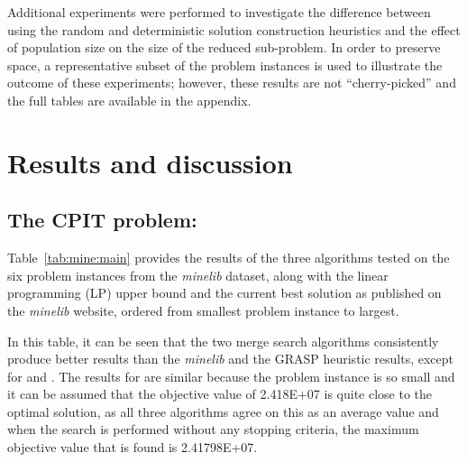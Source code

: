 \documentclass[journal]{IEEEtran}
\begin{document}
Additional experiments were performed to investigate the difference between using the random and deterministic solution construction heuristics and the effect of population size on the size of the reduced sub-problem. In order to preserve space, a representative subset of the problem instances is used to illustrate the outcome of these experiments; however, these results are not ``cherry-picked'' and the full tables are available in the appendix. 

\section{Results and discussion}\label{sec:results}
\subsection{The CPIT problem:}
Table~\ref{tab:mine:main} provides the results of the three algorithms tested on the six problem instances from the \emph{minelib} dataset, along with the linear programming (LP) upper bound and the current best solution as published on the \emph{minelib} website, ordered from smallest problem instance to largest.

In this table, it can be seen that the two merge search algorithms consistently produce better results than the \emph{minelib} and the GRASP heuristic results, except for \newman{} and \zucklarge{}. The results for \newman{} are similar because the problem instance is so small and it can be assumed that the objective value of 2.418E+07 is quite close to the optimal solution, as all three algorithms agree on this as an average value and when the search is performed without any stopping criteria, the maximum objective value that is found is 2.41798E+07.
\end{document}

